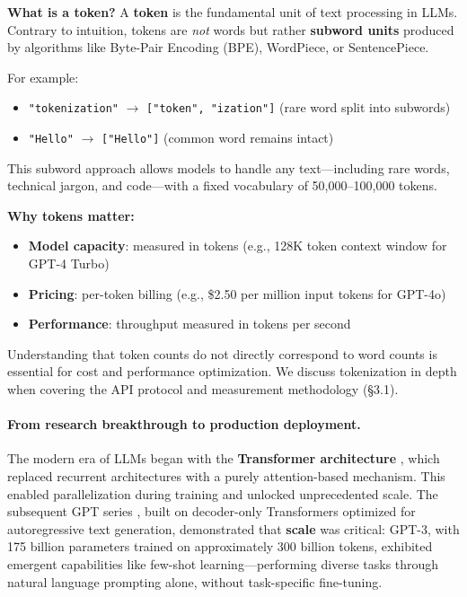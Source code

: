 \documentclass[english]{article}
\begin{document}
\medskip

\noindent\textbf{What is a token?}
A \textbf{token} is the fundamental unit of text processing in LLMs. Contrary to intuition, tokens are \emph{not} words but rather \textbf{subword units} produced by algorithms like Byte-Pair Encoding (BPE), WordPiece, or SentencePiece.

For example:
\begin{itemize}
    \item \texttt{"tokenization"} $\rightarrow$ \texttt{["token", "ization"]} (rare word split into subwords)
    \item \texttt{"Hello"} $\rightarrow$ \texttt{["Hello"]} (common word remains intact)
\end{itemize}

\noindent This subword approach allows models to handle any text—including rare words, technical jargon, and code—with a fixed vocabulary of 50,000--100,000 tokens.

\medskip

\noindent\textbf{Why tokens matter:}
\begin{itemize}
    \item \textbf{Model capacity}: measured in tokens (e.g., 128K token context window for GPT-4 Turbo)
    \item \textbf{Pricing}: per-token billing (e.g., \$2.50 per million input tokens for GPT-4o)
    \item \textbf{Performance}: throughput measured in tokens per second
\end{itemize}

\noindent Understanding that token counts do not directly correspond to word counts is essential for cost and performance optimization. We discuss tokenization in depth when covering the API protocol and measurement methodology (§3.1).

\paragraph{From research breakthrough to production deployment.}

The modern era of LLMs began with the \textbf{Transformer architecture} \parencite{vaswani2017attention}, which replaced recurrent architectures with a purely attention-based mechanism. This enabled parallelization during training and unlocked unprecedented scale. The subsequent GPT series \parencite{radford2018improving,radford2019language,brown2020language}, built on decoder-only Transformers optimized for autoregressive text generation, demonstrated that \textbf{scale} was critical: GPT-3, with 175 billion parameters trained on approximately 300 billion tokens, exhibited emergent capabilities like few-shot learning—performing diverse tasks through natural language prompting alone, without task-specific fine-tuning.
\end{document}
